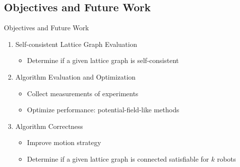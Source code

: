 \documentclass[10pt]{beamer}
\begin{document}
\subsection[future]{Objectives and Future Work}
\begin{frame}{Objectives and Future Work}{}
  \begin{enumerate}
  \item Self-consistent Lattice Graph Evaluation
    \begin{itemize}
    \item Determine if a given lattice graph is self-consistent
    \end{itemize}
  \item Algorithm Evaluation and Optimization
    \begin{itemize}
    \item Collect measurements of experiments
    \item Optimize performance: potential-field-like methods
    \end{itemize}
  \item Algorithm Correctness
    \begin{itemize}
    \item Improve motion strategy
    \item Determine if a given lattice graph is connected satisfiable for $k$
      robots
    \end{itemize}
  \end{enumerate}
\end{frame}
\end{document}

